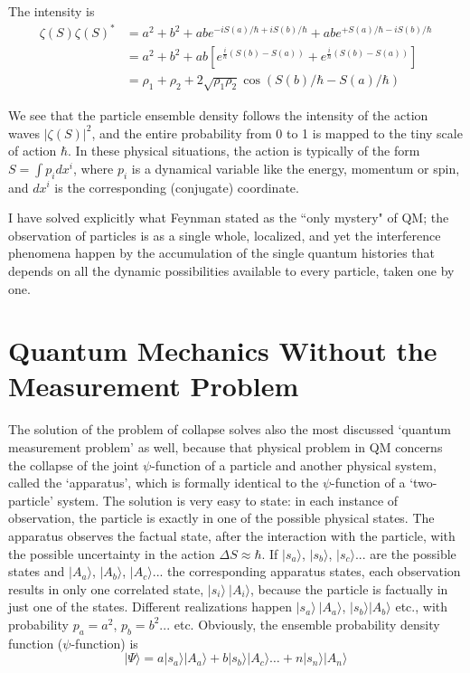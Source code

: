 The intensity is
\begin{align*}
\zeta (S) \zeta (S)^{\ast} & = a^2 + b^2 + abe^{-iS (a) /\hbar + iS (b)/\hbar} + abe^{+ S (a)/\hbar - iS (b)/\hbar}  \\
& = a^2 + b^2 + ab \left[e^{\frac{i}{\hbar} (S(b) - S(a))} + e^{\frac{i}{\hbar}(S(b) - S (a))} \right] \tag{30}\\
& = \rho_1 + \rho_2 + 2 \sqrt{\rho_1 \rho_2} \cos  (S (b) / \hbar - S (a) / \hbar) \tag{31}
\end{align*}

We see that the particle ensemble density follows the intensity of the action waves $|\zeta(S)|^2$,
and the entire probability from 0 to 1 is mapped to the tiny scale of action $\hbar$. In these physical
situations, the action is typically of the form $S = \int p_i dx^i$, where $p_i$ is a dynamical variable
like the energy, momentum or spin, and $dx^i$ is the corresponding (conjugate) coordinate.

I have solved explicitly what Feynman stated as the ``only mystery" of QM; the observation of
 particles is as a single whole, localized, and yet the interference phenomena happen
by the accumulation of the single quantum histories that depends on all the dynamic possibilities available to every particle, taken one by one.


\section{Quantum Mechanics Without the Measurement Problem}%

The solution of the problem of collapse solves also the most discussed `quantum measurement problem' \cite{chap27-key8} as well, because that physical problem in QM concerns the collapse of the joint $\psi$-function of a particle and another physical system, called the `apparatus', which is
formally identical to the $\psi$-function of a `two-particle' system. The solution is very easy to
state: in each instance of observation, the particle is exactly in one of the possible physical
states. The apparatus observes the factual state, after the interaction with the particle,
with the possible uncertainty in the action $\Delta S \approx \hbar$. If $|s_a  \rangle$, $|s_b\rangle$, $|s_c\rangle...$ are the possible
states and $|A_a \rangle$, $|A_b \rangle$, $|A_c \rangle ...$ the corresponding apparatus states, each observation results in
only one correlated state, $|s_i \rangle ~|A_i \rangle$, because the particle is factually in just one of the states.
Different realizations happen $|s_a \rangle ~ |A_a  \rangle$, $|s_b  \rangle | A_b \rangle$ etc., with probability $p_a = a^2$, $p_b = b^2 ...$ etc.
Obviously, the ensemble probability density function ($\psi$-function) is
\begin{equation*}
|\Psi \rangle = a | s_a \rangle | A_a \rangle + b |s_b \rangle | A_c \rangle \ldots + n | s_n \rangle | A_n \rangle \tag{32}
\end{equation*}

